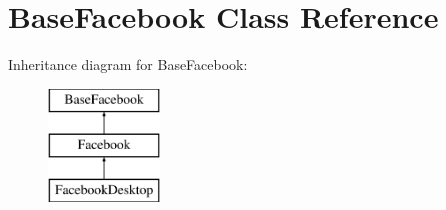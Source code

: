 \hypertarget{class_base_facebook}{\section{Base\-Facebook Class Reference}
\label{class_base_facebook}
}
Inheritance diagram for Base\-Facebook\-:\begin{figure}[H]
\begin{center}
\leavevmode
\includegraphics[height=3.000000cm]{class_base_facebook}
\end{center}
\end{figure}
